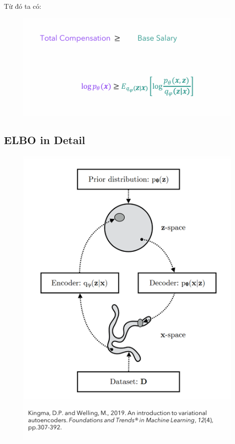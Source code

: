 \documentclass{book}
\begin{document}
Từ đó ta có:
\begin{figure}[H]
    \centering
    \includegraphics[width=0.75\linewidth]{images/VAE_kf2.png}
\end{figure}

\subsection{ELBO in Detail}

\begin{figure}[H]
    \centering
    \includegraphics[width=0.75\linewidth]{images/VAE_kf3.png}
\end{figure}
\end{document}
